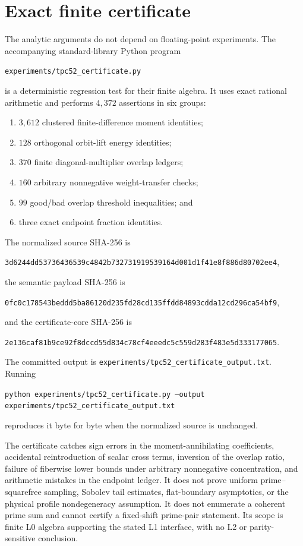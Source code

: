 \section{Exact finite certificate}
\label{sec:tpc52-certificate}

The analytic arguments do not depend on floating-point experiments.
The accompanying standard-library Python program
\begin{center}
 \texttt{experiments/tpc52\_certificate.py}
\end{center}
is a deterministic regression test for their finite algebra.  It uses
exact rational arithmetic and performs \(4{,}372\) assertions in six
groups:
\begin{enumerate}[label=\textup{(C\arabic*)},leftmargin=3.2em]
 \item \(3{,}612\) clustered finite-difference moment identities;
 \item \(128\) orthogonal orbit-lift energy identities;
 \item \(370\) finite diagonal-multiplier overlap ledgers;
 \item \(160\) arbitrary nonnegative weight-transfer checks;
 \item \(99\) good/bad overlap threshold inequalities; and
 \item three exact endpoint fraction identities.
\end{enumerate}
The normalized source SHA-256 is
\begin{center}
{\small\texttt{3d6244dd53736436539c4842b732731919539164d001d1f41e8f886d80702ee4}},
\end{center}
the semantic payload SHA-256 is
\begin{center}
{\small\texttt{0fc0c178543beddd5ba86120d235fd28cd135ffdd84893cdda12cd296ca54bf9}},
\end{center}
and the certificate-core SHA-256 is
\begin{center}
{\small\texttt{2e136caf81b9ce92f8dccd55d834c78cf4eeedc5c559d283f483e5d333177065}}.
\end{center}
The committed output is
\texttt{experiments/tpc52\_certificate\_output.txt}.  Running
\begin{center}
\texttt{python experiments/tpc52\_certificate.py
        --output experiments/tpc52\_certificate\_output.txt}
\end{center}
reproduces it byte for byte when the normalized source is unchanged.

The certificate catches sign errors in the moment-annihilating
coefficients, accidental reintroduction of scalar cross terms, inversion
of the overlap ratio, failure of fiberwise lower bounds under arbitrary
nonnegative concentration, and arithmetic mistakes in the endpoint
ledger.  It does not prove uniform prime--squarefree sampling, Sobolev
tail estimates, flat-boundary asymptotics, or the physical profile
nondegeneracy assumption.  It does not enumerate a coherent prime sum
and cannot certify a fixed-shift prime-pair statement.  Its scope is
finite L0 algebra supporting the stated L1 interface, with no L2 or
parity-sensitive conclusion.
